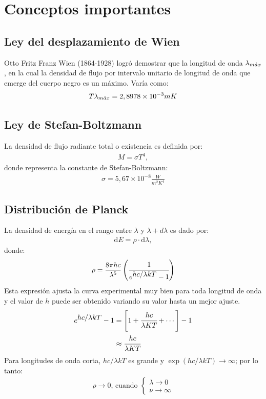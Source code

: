 \documentclass[../main]{subfiles}
\begin{document}
\section{Conceptos importantes}
\subsection{Ley del desplazamiento de Wien}
Otto Fritz Franz Wien (1864-1928) logró demostrar que la longitud de onda $\lambda_{m\Acute{a}x}$, en la cual la densidad de flujo por intervalo unitario de longitud de onda que emerge del cuerpo negro es un máximo. Varía como:
\begin{align}
T\lambda_{m\Acute{a}x}=2,8978\times 10^{-3} m K    
\end{align}
\subsection{Ley de Stefan-Boltzmann}
La densidad de flujo radiante total o existencia es definida por:
\begin{align}
    M=\sigma T^4,
\end{align}
donde representa la constante de Stefan-Boltzmann:
\begin{align}
    \sigma=5,67\times 10^{-8} \frac{W}{m^2K^4}
\end{align}
\subsection{Distribución de Planck}
La densidad de energía en el rango entre $\lambda$ y $\lambda+d\lambda$ es dado por:
\begin{align}
    \text{d}E=\rho\cdot\text{d}\lambda, \label{eq3}
\end{align}
donde:
\begin{align}
    \rho=\frac{8\pi hc}{\lambda^5}\left(\cfrac{1}{e^{\displaystyle 
    hc/\lambda kT}-1}\right)
\end{align}
Esta expresión ajusta la curva experimental muy bien para toda longitud de onda y el valor de $h$ puede ser obtenido variando su valor hasta un mejor ajuste.
\begin{align}
    e^{\displaystyle hc/\lambda kT}-1&=\left[1+\cfrac{hc}{\lambda KT}+\cdots \right]-1\\
    &\approx \cfrac{hc}{\lambda KT}
\end{align}
Para longitudes de onda corta, $\displaystyle hc/\lambda kT$ es grande y $\exp(hc/\lambda kT)\rightarrow\infty$; por lo tanto:
\begin{align}
    \rho \rightarrow 0\text{, cuando }\begin{cases}
        \lambda \rightarrow 0\\
        \nu \rightarrow \infty
    \end{cases}
\end{align}
\end{document}
